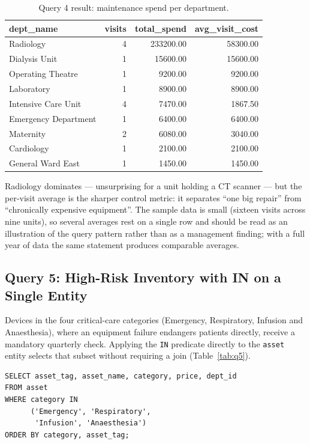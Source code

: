 \documentclass[conference]{IEEEtran}
\begin{document}
\begin{table}[!t]
  \caption{Query 4 result: maintenance spend per department.}
  \label{tab:q4}
  \centering
  \footnotesize
  \begin{tabular}{lrrr}
    \toprule
    dept\_name & visits & total\_spend & avg\_visit\_cost \\
    \midrule
    Radiology & 4 & 233200.00 & 58300.00 \\
    Dialysis Unit & 1 & 15600.00 & 15600.00 \\
    Operating Theatre & 1 & 9200.00 & 9200.00 \\
    Laboratory & 1 & 8900.00 & 8900.00 \\
    Intensive Care Unit & 4 & 7470.00 & 1867.50 \\
    Emergency Department & 1 & 6400.00 & 6400.00 \\
    Maternity & 2 & 6080.00 & 3040.00 \\
    Cardiology & 1 & 2100.00 & 2100.00 \\
    General Ward East & 1 & 1450.00 & 1450.00 \\
    \bottomrule
  \end{tabular}
\end{table}

Radiology dominates --- unsurprising for a unit holding a CT scanner --- but
the per-visit average is the sharper control metric: it separates ``one big
repair'' from ``chronically expensive equipment''. The sample data is small
(sixteen visits across nine units), so several averages rest on a single row
and should be read as an illustration of the query pattern rather than as a
management finding; with a full year of data the same statement produces
comparable averages.

\subsection{Query 5: High-Risk Inventory with IN on a Single Entity}\label{sec:q5}
Devices in the four critical-care categories (Emergency, Respiratory,
Infusion and Anaesthesia), where an equipment failure endangers patients
directly, receive a mandatory quarterly check. Applying the \texttt{IN}
predicate directly to the \texttt{asset} entity selects that subset without
requiring a join (Table~\ref{tab:q5}).

\begin{lstlisting}[style=sqlstyle]
SELECT asset_tag, asset_name, category, price, dept_id
FROM asset
WHERE category IN
      ('Emergency', 'Respiratory',
       'Infusion', 'Anaesthesia')
ORDER BY category, asset_tag;
\end{lstlisting}
\end{document}
